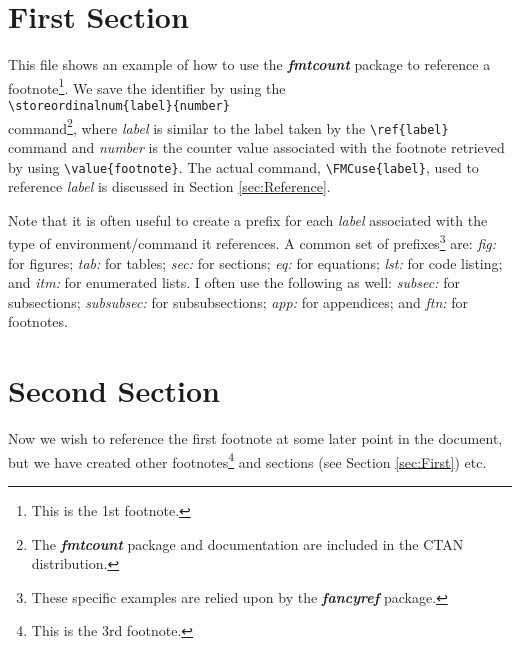 \documentclass[pdftex,letterpaper,11pt]{article}
\begin{document}
\section{\label{sec:First}First Section}

\indent  This file shows an example of how to use the \textbf{\textit{fmtcount}} package to reference a footnote\footnote{This is the 1st footnote.}.  We save the identifier by using the \\
\verb+\storeordinalnum{label}{number}+ \\
command\footnote{The \textbf{\textit{fmtcount}} package and documentation are included in the CTAN distribution.}, where \textit{label} is similar to the label taken by the \verb+\ref{label}+ command and \textit{number} is the counter value associated with the footnote retrieved by using \verb+\value{footnote}+.  The actual command, \verb+\FMCuse{label}+, used to reference \textit{label} is discussed in Section \ref{sec:Reference}.  

\indent  Note that it is often useful to create a prefix for each \textit{label} associated with the type of environment/command it references.  A common set of prefixes\footnote{These specific examples are relied upon by the \textbf{\textit{fancyref}} package.} are:  \emph{fig:} for figures; \emph{tab:} for tables; \emph{sec:} for sections; \emph{eq:} for equations; \emph{lst:} for code listing; and \emph{itm:} for enumerated lists.  I often use the following as well:  \emph{subsec:} for subsections; \emph{subsubsec:} for subsubsections; \emph{app:} for appendices; and \emph{ftn:} for footnotes.

\section{\label{sec:Second}Second Section}
\indent  Now we wish to reference the first footnote at some later point in the document, but we have created other footnotes\footnote{This is the 3rd footnote.} and sections (see Section \ref{sec:First}) etc.
\end{document}
